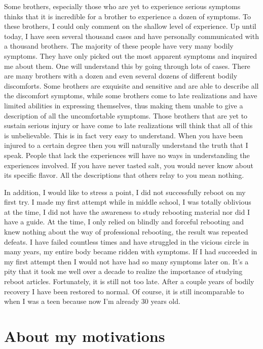 \documentclass[
]{book}
\begin{document}
Some brothers, especially those who are yet to experience serious symptoms thinks that it is incredible for a brother to experience a dozen of symptoms. To these brothers, I could only comment on the shallow level of experience. Up until today, I have seen several thousand cases and have personally communicated with a thousand brothers. The majority of these people have very many bodily symptoms. They have only picked out the most apparent symptoms and inquired me about them. One will understand this by going through lots of cases. There are many brothers with a dozen and even several dozens of different bodily discomforts. Some brothers are exquisite and sensitive and are able to describe all the discomfort symptoms, while some brothers come to late realizations and have limited abilities in expressing themselves, thus making them unable to give a description of all the uncomfortable symptoms. Those brothers that are yet to sustain serious injury or have come to late realizations will think that all of this is unbelievable. This is in fact very easy to understand. When you have been injured to a certain degree then you will naturally understand the truth that I speak. People that lack the experiences will have no ways in understanding the experiences involved. If you have never tasted salt, you would never know about its specific flavor. All the descriptions that others relay to you mean nothing.

In addition, I would like to stress a point, I did not successfully reboot on my first try. I made my first attempt while in middle school, I was totally oblivious at the time, I did not have the awareness to study rebooting material nor did I have a guide. At the time, I only relied on blindly and forceful rebooting and knew nothing about the way of professional rebooting, the result was repeated defeats. I have failed countless times and have struggled in the vicious circle in many years, my entire body became ridden with symptoms. If I had succeeded in my first attempt then I would not have had so many symptoms later on. It's a pity that it took me well over a decade to realize the importance of studying reboot articles. Fortunately, it is still not too late. After a couple years of bodily recovery I have been restored to normal. Of course, it is still incomparable to when I was a teen because now I'm already 30 years old.

\hypertarget{about-my-motivations}{%
\section{About my motivations}\label{about-my-motivations}}
\end{document}
